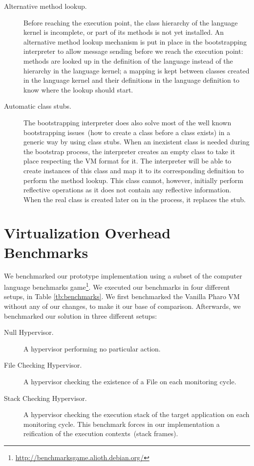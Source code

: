 \begin{description}
\item[Alternative method lookup.] Before reaching the execution point, the class hierarchy of the language kernel is incomplete, or part of its methods is not yet installed. An alternative method lookup mechanism is put in place in the bootstrapping interpreter to allow message sending before we reach the execution point: methods are looked up in the definition of the language instead of the hierarchy in the language kernel; a mapping is kept between classes created in the language kernel and their definitions in the language definition to know where the lookup should start.

\item[Automatic class stubs.] The bootstrapping interpreter does also solve most of the well known bootstrapping issues~(\eg how to create a class before a class exists) in a generic way by using class stubs. When an inexistent class is needed during the bootstrap process, the interpreter creates an empty class to take it place respecting the VM format for it. The interpreter will be able to create instances of this class and map it to its corresponding definition to perform the method lookup. This class cannot, however, initially perform reflective operations as it does not contain any reflective information. When the real class is created later on in the process, it replaces the stub.
\end{description}

\section{Virtualization Overhead Benchmarks} \label{sec:virtualization_benchmarks}

We benchmarked our prototype implementation using a subset of the computer language benchmarks game\footnote{\url{http://benchmarksgame.alioth.debian.org/}}. We executed our benchmarks in four different setups, in Table \ref{tb:benchmarks}. We first benchmarked the Vanilla Pharo VM without any of our changes, to make it our base of comparison. Afterwards, we benchmarked our solution in three different setups:

\begin{description}
\item[Null Hypervisor.] A hypervisor performing no particular action.
\item[File Checking Hypervisor.] A hypervisor checking the existence of a File on each monitoring cycle.
\item[Stack Checking Hypervisor.] A hypervisor checking the execution stack of the target application on each monitoring cycle. This benchmark forces in our implementation a reification of the execution contexts~(stack frames).
\end{description}

